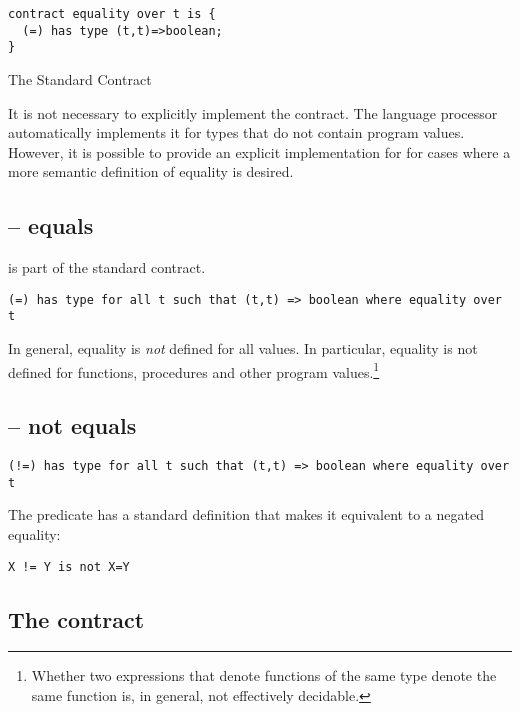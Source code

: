 \begin{program}
\begin{lstlisting}
contract equality over t is {
  (=) has type (t,t)=>boolean;
}
\end{lstlisting}
\caption{The Standard  Contract\label{equalityContract}}
\end{program}

It is not necessary to explicitly implement the  contract. The language processor automatically implements it for types that do not contain program values. However, it is possible to provide an explicit implementation for  for cases where a more semantic definition of equality is desired.

\subsection{\q{=} -- equals}
\label{equalsPredicate}
\q{=} is part of the standard  contract.
\begin{lstlisting}
(=) has type for all t such that (t,t) => boolean where equality over t
\end{lstlisting}
In general, equality is \emph{not} defined for all values. In particular, equality is not defined for functions, procedures and other program values.\footnote{Whether two expressions that denote functions of the same type denote the same function is, in general, not effectively decidable.}

\subsection{\q{!=} -- not equals}
\label{notEqualsPredicate}
\begin{lstlisting}
(!=) has type for all t such that (t,t) => boolean where equality over t
\end{lstlisting}
The \q{!=} predicate has a standard definition that makes it equivalent to a negated equality:
\begin{lstlisting}
X != Y is not X=Y
\end{lstlisting}

\subsection{The  contract}
\label{comparisonPredicates}


